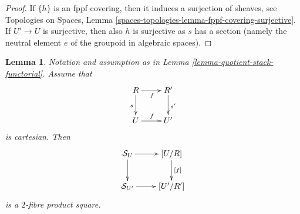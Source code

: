 \documentclass{stacks-project}
\theoremstyle{plain}
\newtheorem{lemma}[subsection]{Lemma}
\theoremstyle{definition}
\theoremstyle{remark}
\numberwithin{equation}{subsection}
\begin{document}
\begin{proof}
\medskip\noindent
If $\{h\}$ is an fppf covering, then it induces a surjection of sheaves, see
Topologies on Spaces,
Lemma \ref{spaces-topologies-lemma-fppf-covering-surjective}.
If $U' \to U$ is surjective, then also $h$ is surjective as $s$ has a section
(namely the neutral element $e$ of the groupoid in algebraic spaces).
\end{proof}

\begin{lemma}
\label{lemma-criterion-fibre-product}
Notation and assumption as in
Lemma \ref{lemma-quotient-stack-functorial}.
Assume that
$$
\xymatrix{
R \ar[d]_s \ar[r]_f & R' \ar[d]^{s'} \\
U \ar[r]^f & U'
}
$$
is cartesian. Then
$$
\xymatrix{
\mathcal{S}_U \ar[d] \ar[r] & [U/R] \ar[d]^{[f]} \\
\mathcal{S}_{U'} \ar[r] & [U'/R']
}
$$
is a $2$-fibre product square.
\end{lemma}
\end{document}
